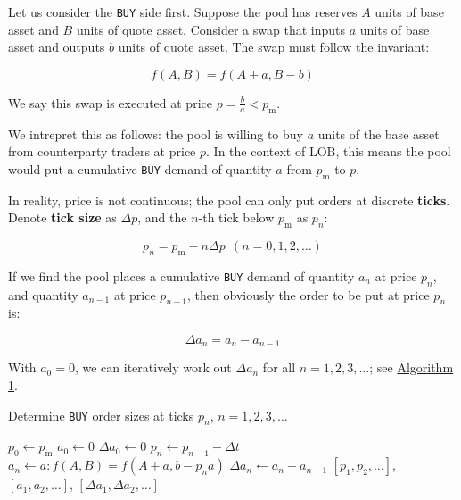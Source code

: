\documentclass{article}
\begin{document}
Let us consider the \texttt{BUY} side first. Suppose the pool has reserves $A$ units of base asset and $B$ units of quote asset. Consider a swap that inputs $a$ units of base asset and outputs $b$ units of quote asset. The swap must follow the invariant:

\begin{equation}
  f(A, B) = f(A + a, B - b)
\end{equation}

We say this swap is executed at price $p = \frac{b}{a} < p_{\mathrm{m}}$.

We intrepret this as follows: the pool is willing to buy $a$ units of the base asset from counterparty traders at price $p$. In the context of LOB, this means the pool would put a cumulative \texttt{BUY} demand of quantity $a$ from $p_{\mathrm{m}}$ to $p$.

In reality, price is not continuous; the pool can only put orders at discrete \textbf{ticks}. Denote \textbf{tick size} as $\Delta p$, and the $n$-th tick below $p_{\mathrm{m}}$ as $p_n$:

\begin{equation}
  p_n = p_{\mathrm{m}} - n \Delta p \ \ (n = 0, 1, 2, \dots)
\end{equation}

If we find the pool places a cumulative \texttt{BUY} demand of quantity $a_n$ at price $p_n$, and quantity $a_{n-1}$ at price $p_{n-1}$, then obviously the order to be put at price $p_n$ is:

\begin{equation}
  \Delta a_n = a_n - a_{n-1}
\end{equation}

With $a_0 = 0$, we can iteratively work out $\Delta a_n$ for all $n = 1, 2, 3, \dots$; see \hyperref[alg:1]{Algorithm 1}.

\begin{algorithm}
  \caption{Determine \texttt{BUY} order sizes at ticks $p_n$, $n = 1, 2, 3, \dots$}
  \label{alg:1}
  \begin{algorithmic}
    \State $p_0 \gets p_{\mathrm{m}}$
    \State $a_0 \gets 0$
    \State $\Delta a_0 \gets 0$
    \State $p_n \gets p_{n-1} - \Delta t$
    \State $a_n \gets a: f(A, B) = f(A + a, b - p_n a)$ 
    \State $\Delta a_n \gets a_n - a_{n-1}$
    \EndFor
    \State \Return $[p_1, p_2, \dots]$, $[a_1, a_2, \dots]$, $[\Delta a_1, \Delta a_2, \dots]$
  \end{algorithmic}
\end{algorithm}
\end{document}
